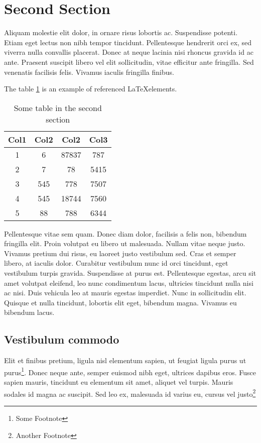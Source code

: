 \section{Second Section}
 Aliquam molestie elit dolor, in ornare risus lobortis ac. Suspendisse potenti. Etiam eget lectus non nibh tempor tincidunt. Pellentesque hendrerit orci ex, sed viverra nulla convallis placerat. Donec at neque lacinia nisi rhoncus gravida id ac ante. Praesent suscipit libero vel elit sollicitudin, vitae efficitur ante fringilla. Sed venenatis facilisis felis. Vivamus iaculis fringilla finibus.

The table \ref{table:1} is an example of referenced \LaTeX elements.

\begin{table}[htb]
    \centering
    \caption{Some table in the second section}
    \begin{tabular}{||c c c c||} 
 \hline
 Col1 & Col2 & Col2 & Col3 \\ [0.5ex] 
 \hline\hline
 1 & 6 & 87837 & 787 \\ 
 2 & 7 & 78 & 5415 \\
 3 & 545 & 778 & 7507 \\
 4 & 545 & 18744 & 7560 \\
 5 & 88 & 788 & 6344 \\ [1ex] 
 \hline
\end{tabular}
    \label{table:1}
\end{table}

Pellentesque vitae sem quam. Donec diam dolor, facilisis a felis non, bibendum fringilla elit. Proin volutpat eu libero ut malesuada. Nullam vitae neque justo. Vivamus pretium dui risus, eu laoreet justo vestibulum sed. Cras et semper libero, at iaculis dolor. Curabitur vestibulum nunc id orci tincidunt, eget vestibulum turpis gravida. Suspendisse at purus est. Pellentesque egestas, arcu sit amet volutpat eleifend, leo nunc condimentum lacus, ultricies tincidunt nulla nisi ac nisi. Duis vehicula leo at mauris egestas imperdiet. Nunc in sollicitudin elit. Quisque et nulla tincidunt, lobortis elit eget, bibendum magna. Vivamus eu bibendum lacus. 

\subsection{Vestibulum commodo}
Elit et finibus pretium, ligula nisl elementum sapien, ut feugiat ligula purus ut purus\footnote{Some Footnote}. Donec neque ante, semper euismod nibh eget, ultrices dapibus eros. Fusce sapien mauris, tincidunt eu elementum sit amet, aliquet vel turpis. Mauris sodales id magna ac suscipit. Sed leo ex, malesuada id varius eu, cursus vel justo\footnote{Another Footnote}

